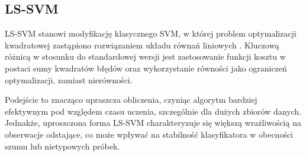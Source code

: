 \documentclass[a4paper,twoside,12pt]{book}
\begin{document}
\subsection*{LS-SVM}
LS-SVM stanowi modyfikację klasycznego SVM, w której problem optymalizacji kwadratowej zastąpiono rozwiązaniem układu równań liniowych \cite{suykens2002}. Kluczową różnicą w stosunku do standardowej wersji jest zastosowanie funkcji kosztu w postaci sumy kwadratów błędów oraz wykorzystanie równości jako ograniczeń optymalizacji, zamiast nierówności.

Podejście to znacząco upraszcza obliczenia, czyniąc algorytm bardziej efektywnym pod względem czasu uczenia, szczególnie dla dużych zbiorów danych. Jednakże, uproszczona forma LS-SVM charakteryzuje się większą wrażliwością na obserwacje odstające, co może wpływać na stabilność klasyfikatora w obecności szumu lub nietypowych próbek.
\end{document}
